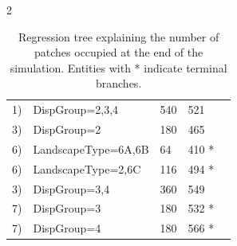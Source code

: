 \documentclass[12pt,pdftex]{article}
\begin{document}
\begin{spacing}{2}
\begin{table}
\begin{tabular}{lllll}
\hspace{0.4cm} 1) 			&DispGroup=2,3,4 				&540 										 	&521  \\		
\hspace{1.2cm} 3) 			&DispGroup=2 					&180 											&465  \\		
\hspace{2.4cm} 6) 			&LandscapeType=6A,6B 		&64 										 	&410 *\\	
\hspace{2.4cm} 6) 			&LandscapeType=2,6C 			&116 									 		&494 *\\		
\hspace{1.2cm} 3) 			&DispGroup=3,4 					&360 											&549  \\		 	
\hspace{2.8cm} 7) 			&DispGroup=3 					&180 										 	&532 *\\
\hspace{2.8cm} 7)			&DispGroup=4 					&180											&566 *\\		
\hline
\end{tabular}
\caption{Regression tree explaining the number of patches occupied at the end of the simulation. Entities with * indicate terminal branches.}
\end{table}


\end{spacing}
\end{document}

